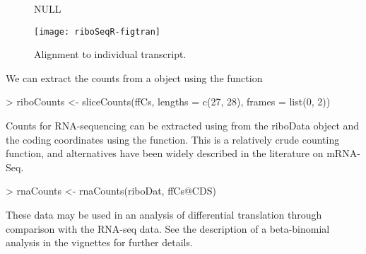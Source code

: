 \documentclass[a4paper]{article}
\begin{document}
\begin{figure}[!ht]
\begin{center}
\begin{Schunk}
\begin{Soutput}
NULL
\end{Soutput}
\end{Schunk}
\texttt{[image: riboSeqR-figtran]}
\caption{Alignment to individual transcript.}
\label{fig:trans}
\end{center}
\end{figure}

We can extract the counts from a  object using the  function

\begin{Schunk}
\begin{Sinput}
> riboCounts <- sliceCounts(ffCs, lengths = c(27, 28), frames = list(0, 2))
\end{Sinput}
\end{Schunk}

Counts for RNA-sequencing can be extracted using from the riboData object and the coding coordinates using the  function. This is a relatively crude counting function, and alternatives have been widely described in the literature on mRNA-Seq.

\begin{Schunk}
\begin{Sinput}
> rnaCounts <- rnaCounts(riboDat, ffCs@CDS)
\end{Sinput}
\end{Schunk}

These data may be used in an analysis of differential translation through comparison with the RNA-seq data. See the description of a beta-binomial analysis in the  vignettes for further details.
\end{document}
